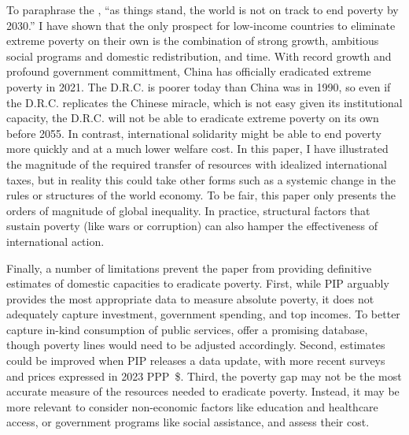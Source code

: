 \documentclass[12pt,english]{article}
\begin{document}
To paraphrase the \cite{un_sustainable_2022}, ``as things stand, the world is not on track to end poverty by 2030.'' I have shown that the only prospect for low-income countries to eliminate extreme poverty on their own is the combination of strong growth, ambitious social programs and domestic redistribution, and time. 
With record growth and profound government committment, China has officially eradicated extreme poverty in 2021. The D.R.C. is poorer today than China was in 1990, %
so even if the D.R.C. replicates the Chinese miracle, which is not easy given its institutional capacity, the D.R.C. will not be able to eradicate extreme poverty on its own before 2055. %
In contrast, international solidarity might be able to end poverty more quickly and at a much lower welfare cost. In this paper, I have illustrated the magnitude of the required transfer of resources with idealized international taxes, but in reality this could take other forms such as a systemic change in the rules or structures of the world economy. 
To be fair, this paper only presents the orders of magnitude of global inequality. %
In practice, structural factors that sustain poverty (like wars or corruption) %
can also hamper the effectiveness of international action. %

Finally, a number of limitations prevent the paper from providing definitive estimates of domestic capacities to eradicate poverty. First, while PIP arguably provides the most appropriate data to measure absolute poverty, it does not adequately capture investment, government spending, and top incomes. To better capture in-kind consumption of public services, \cite{fisher-post_government_2023} offer a promising database, though poverty lines would need to be adjusted accordingly. Second, estimates could be improved when PIP releases a data update, with more recent surveys and prices expressed in 2023 PPP~\$. Third, the poverty gap may not be the most accurate measure of the resources needed to eradicate poverty. Instead, it may be more relevant to consider non-economic factors like education and healthcare access, or government programs like social assistance, and assess their cost.

  \begin{small} %



\end{small}  %
\end{document}
